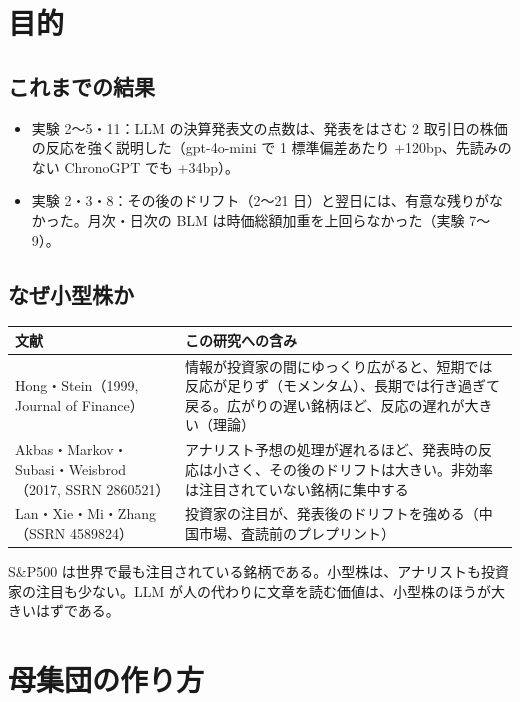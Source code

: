 \documentclass[xelatex,ja=standard,jafont=haranoaji,a4paper,10pt,openany]{bxjsreport}
\newcommand{\SP}{S\&P500}
\begin{document}
\chapter{目的}\label{ch:purpose}

\section{これまでの結果}

\begin{itemize}
\item 実験 2〜5・11：LLM の決算発表文の点数は、発表をはさむ 2 取引日の株価の反応を強く説明した（gpt-4o-mini で 1 標準偏差あたり +120bp、先読みのない ChronoGPT でも +34bp）。
\item 実験 2・3・8：その後のドリフト（2〜21 日）と翌日には、有意な残りがなかった。月次・日次の BLM は時価総額加重を上回らなかった（実験 7〜9）。
\end{itemize}

\section{なぜ小型株か}

\begin{longtable}{p{4.4cm}p{9.8cm}}
\toprule
\textbf{文献} & \textbf{この研究への含み} \\
\midrule
\endhead
\bottomrule
\endfoot
Hong・Stein（1999, Journal of Finance） & 情報が投資家の間にゆっくり広がると、短期では反応が足りず（モメンタム）、長期では行き過ぎて戻る。広がりの遅い銘柄ほど、反応の遅れが大きい（理論） \\
Akbas・Markov・Subasi・Weisbrod（2017, SSRN 2860521） & アナリスト予想の処理が遅れるほど、発表時の反応は小さく、その後のドリフトは大きい。非効率は注目されていない銘柄に集中する \\
Lan・Xie・Mi・Zhang（SSRN 4589824） & 投資家の注目が、発表後のドリフトを強める（中国市場、査読前のプレプリント） \\
\end{longtable}

\SP{} は世界で最も注目されている銘柄である。小型株は、アナリストも投資家の注目も少ない。LLM が人の代わりに文章を読む価値は、小型株のほうが大きいはずである。

\chapter{母集団の作り方}\label{ch:population}
\end{document}
